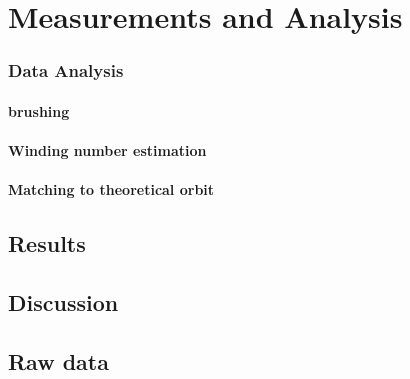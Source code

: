 \documentclass[]{report}
\begin{document}
%

%

\part{Measurements and Analysis}
\section{Data Analysis}


\subsection{brushing}


\subsection{Winding number estimation}

\subsection{Matching to theoretical orbit}


\chapter{Results}


\chapter{Discussion}

\appendix
\chapter{Raw data}

%
%
%
%
%


\end{document}
